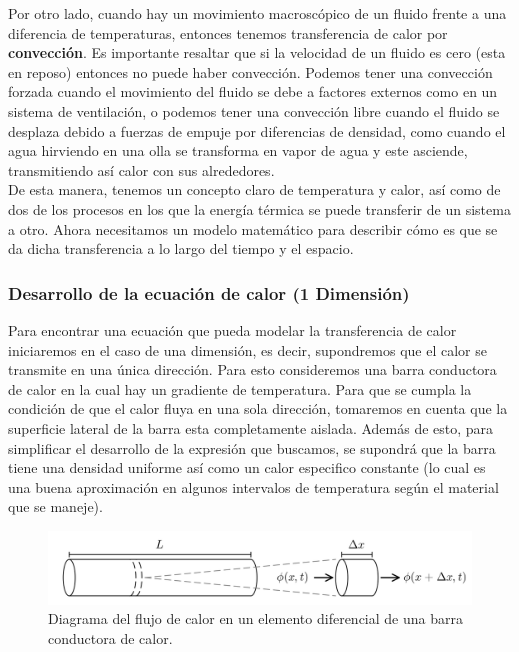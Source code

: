 \documentclass[12pt]{article}
\begin{document}
Por otro lado, cuando hay un movimiento macroscópico de un fluido frente a una diferencia de temperaturas, entonces tenemos transferencia de calor por \textbf{convección}. Es importante resaltar que si la velocidad de un fluido es cero (esta en reposo) entonces no puede haber convección. Podemos tener una convección forzada cuando el movimiento del fluido se debe a factores externos como en un sistema de ventilación, o podemos tener una convección libre cuando el fluido se desplaza debido a fuerzas de empuje por diferencias de densidad, como cuando el agua hirviendo en una olla se transforma en vapor de agua y este asciende, transmitiendo así calor con sus alrededores. \\

De esta manera, tenemos un concepto claro de temperatura y calor, así como de dos de los procesos en los que la energía térmica se puede transferir de un sistema a otro. Ahora necesitamos un modelo matemático para describir cómo es que se da dicha transferencia a lo largo del tiempo y el espacio. \\

\subsubsection{Desarrollo de la ecuación de calor (1 Dimensión)}

Para encontrar una ecuación que pueda modelar la transferencia de calor iniciaremos en el caso de una dimensión, es decir, supondremos que el calor se transmite en una única dirección. Para esto consideremos una barra conductora de calor en la cual hay un gradiente de temperatura. Para que se cumpla la condición de que el calor fluya en una sola dirección, tomaremos en cuenta que la superficie lateral de la barra esta completamente aislada. Además de esto, para simplificar el desarrollo de la expresión que buscamos, se supondrá que la barra tiene una densidad uniforme así como un calor especifico constante (lo cual es una buena aproximación en algunos intervalos de temperatura según el material que se maneje). \\

\begin{figure}[H]
\begin{center}
    \includegraphics[width=1\linewidth]{Barra.png}
    \caption{Diagrama del flujo de calor en un elemento diferencial de una barra conductora de calor.}
\end{center}
\end{figure}
\end{document}
